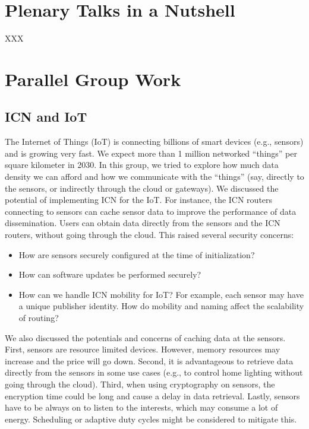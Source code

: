 \documentclass{sig-alternate-10pt}
\begin{document}
\section{Plenary Talks in a Nutshell}
XXX

\section{Parallel Group Work}
\subsection{ICN and IoT}

The Internet of Things (IoT) is connecting billions of smart devices (e.g., sensors) and is growing very fast. We expect more than 1 million networked ``things'' per square kilometer in 2030. In this group, we tried to explore how much data density we can afford
and how we communicate with the ``things'' (say, directly to the sensors, or indirectly through the cloud or gateways). We discussed the potential of implementing ICN for the IoT. For instance, the ICN routers connecting to sensors can cache sensor data to improve the performance of data dissemination. Users can obtain data directly from the sensors and the ICN routers, without going through the cloud. This raised several security concerns:

\begin{itemize}
\item How are sensors securely configured at the time of initialization?
\item How can software updates be performed securely?
\item How can we handle ICN mobility for IoT? For example, each sensor may have a unique publisher identity. How do mobility and naming affect the scalability of routing?
\end{itemize}

We also discussed the potentials and concerns of caching data at the sensors. First, sensors are resource limited devices. However, memory resources may increase and the price will go down. Second, it is advantageous to retrieve data directly from the sensors in some use cases (e.g., to control home lighting without going through the cloud). Third, when using cryptography on sensors, the encryption time could be long and cause a delay in data retrieval. Lastly, sensors have to be always on to listen to the interests, which may consume a lot of energy. Scheduling or adaptive duty cycles might be considered to mitigate this.
\end{document}
